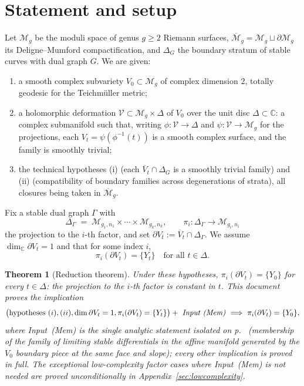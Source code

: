 \documentclass[11pt]{article}
\newcommand{\C}{\mathbb{C}}
\newcommand{\M}{\mathcal{M}}
\newtheorem{thm}{Theorem}[section]
\theoremstyle{definition}
\theoremstyle{remark}
\begin{document}
\section{Statement and setup}

Let $\M_g$ be the moduli space of genus $g \ge 2$ Riemann surfaces,
$\overline{\M}_g = \M_g \sqcup \partial \M_g$ its Deligne--Mumford
compactification, and $\Delta_G$ the boundary stratum of stable curves with
dual graph $G$. We are given:
\begin{enumerate}[label=(\Roman*)]
\item a smooth complex subvariety $V_0 \subset \M_g$ of complex dimension $2$,
totally geodesic for the Teichm\"uller metric;
\item a holomorphic deformation $\mathcal{V} \subset \M_g \times \Delta$ of
$V_0$ over the unit disc $\Delta \subset \C$: a complex submanifold such
that, writing $\phi : \mathcal{V} \to \Delta$ and $\psi : \mathcal{V} \to
\M_g$ for the projections, each $V_t = \psi(\phi^{-1}(t))$ is a smooth
complex surface, and the family is smoothly trivial;
\item the technical hypotheses (i) (each $\overline{V}_t \cap \Delta_G$ is a
smoothly trivial family) and (ii) (compatibility of boundary families across
degenerations of strata), all closures being taken in $\overline{\M}_g$.
\end{enumerate}
Fix a stable dual graph $\Gamma$ with
\[
\Delta_\Gamma \;=\; \M_{g_1,n_1} \times \cdots \times \M_{g_k,n_k},
\qquad \pi_i : \Delta_\Gamma \longrightarrow \M_{g_i,n_i}
\]
the projection to the $i$-th factor, and set
$\partial V_t := \overline{V}_t \cap \Delta_\Gamma$. We assume
$\dim_{\C} \partial V_t = 1$ and that for some index $i$,
\[
\pi_i(\partial V_t) = \{Y_t\} \quad \text{for all } t \in \Delta .
\]

\begin{thm}[Reduction theorem]\label{thm:main}
Under these hypotheses, $\pi_i(\partial V_t) = \{Y_0\}$ for every
$t \in \Delta$: the projection to the $i$-th factor is constant in
$t$. \emph{This document proves the implication}
\[
\bigl(\text{hypotheses } (i), (ii), \dim\partial V_t = 1,
\pi_i(\partial V_t) = \{Y_t\}\bigr)
+\ \emph{Input~(Mem)}
\ \Longrightarrow\ \pi_i(\partial V_t) = \{Y_0\} ,
\]
where \emph{Input~(Mem)} is the single analytic statement isolated on
p.\ \pageref{input:membership} (membership of the family of limiting
stable differentials in the affine manifold generated by the $V_0$
boundary piece at the same face and slope); every other implication is
proved in full. The exceptional low-complexity factor cases where
Input~(Mem) is not needed are proved unconditionally in
Appendix~\ref{sec:lowcomplexity}.
\end{thm}
\end{document}
